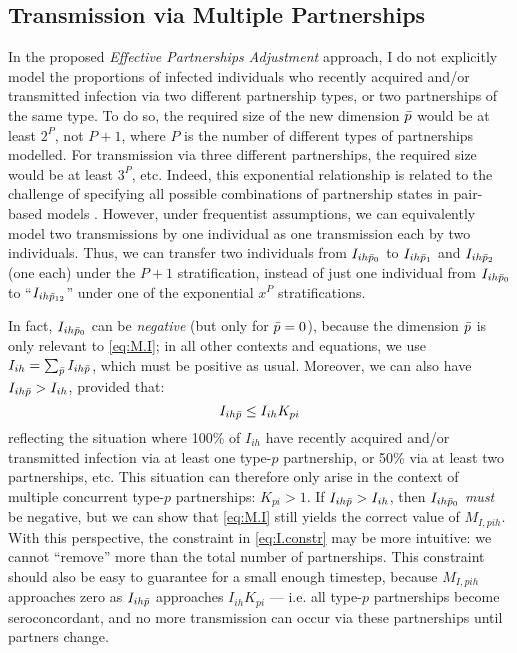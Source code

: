 \subsection{Transmission via Multiple Partnerships}\label{foi.prop.mp}
In the proposed \emph{Effective Partnerships Adjustment} approach,
I do not explicitly model the proportions of infected individuals
who recently acquired and/or transmitted infection via
two different partnership types, or two partnerships of the same type.
To do so, the required size of the new dimension $\bar{p}$ would be at least $2^{P}$, not $P+1$,
where $P$ is the number of different types of partnerships modelled.
For transmission via three different partnerships, the required size would be at least $3^P$, etc.
Indeed, this exponential relationship is related to the challenge of specifying
all possible combinations of partnership states in pair-based models \cite{Kretzschmar2017}.
However, under frequentist assumptions, we can equivalently model
two transmissions by one individual as one transmission each by two individuals.
Thus, we can transfer two individuals from $I_{ih\bar{p}_0}$ to
$I_{ih\bar{p}_1}$ and $I_{ih\bar{p}_2}$ (one each) under the $P+1$ stratification,
instead of just one individual from $I_{ih\bar{p}_0}$ to
``$I_{ih\bar{p}_{12}}$'' under one of the exponential $x^P$ stratifications.
\par
In fact, $I_{ih\bar{p}_0}$ can be \emph{negative} (but only for $\bar{p} = 0$),
because the dimension $\bar{p}$ is only relevant to \eqref{eq:M.I};
in all other contexts and equations,
we use $I_{ih} = \sum_{\bar{p}} I_{ih\bar{p}}$, which must be positive as usual.
Moreover, we can also have $I_{ih\bar{p}} > I_{ih}$, provided that:
\begin{equation}\label{eq:I.constr}
  I_{ih\bar{p}} \le I_{ih} K_{pi}
\end{equation}
reflecting the situation where 100\% of $I_{ih}$
have recently acquired and/or transmitted infection via at least one type-$p$ partnership,
or 50\% via at least two partnerships, etc.
This situation can therefore only arise in the context of
multiple concurrent type-$p$ partnerships: $K_{pi} > 1$.
If $I_{ih\bar{p}} > I_{ih}$, then $I_{ih\bar{p}_0}$ \emph{must} be negative,
but we can show that \eqref{eq:M.I} still yields the correct value of $M_{I,pih}$.
With this perspective, the constraint in \eqref{eq:I.constr} may be more intuitive:
we cannot ``remove'' more than the total number of partnerships.
This constraint should also be easy to guarantee for a small enough timestep,
because $M_{I,pih}$ approaches zero as $I_{ih\bar{p}}$ approaches $I_{ih} K_{pi}$
--- i.e. all type-$p$ partnerships become \hivp seroconcordant,
and no more transmission can occur via these partnerships until partners change.
